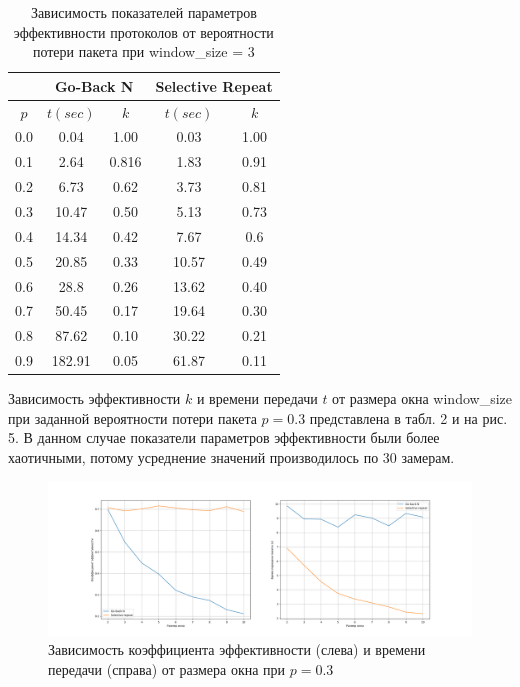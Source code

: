 \begin{table}[H]
	\begin{center}
		\begin{tabular}{|c|c|c|c|c|}
			\hline
			 & \multicolumn{2}{c|}{Go-Back N} & \multicolumn{2}{c|}{Selective Repeat} \\
			\hline
			$p$ & $t (sec)$ & $k$ & $t (sec)$ & $k$ \\
			\hline
			0.0 & 0.04 & 1.00 & 0.03 & 1.00 \\
			\hline
			0.1 & 2.64 & 0.816 & 1.83 & 0.91\\
			\hline
			0.2 & 6.73 & 0.62 & 3.73 & 0.81\\
			\hline
			0.3 & 10.47 & 0.50 & 5.13 & 0.73\\
			\hline
            0.4 & 14.34 & 0.42 & 7.67 & 0.6\\
			\hline
			0.5 & 20.85 & 0.33 & 10.57 & 0.49\\
			\hline
			0.6 & 28.8 & 0.26 & 13.62 & 0.40\\
			\hline
			0.7 & 50.45 & 0.17 & 19.64 & 0.30\\
			\hline
			0.8 & 87.62 & 0.10 & 30.22 & 0.21\\
			\hline
			0.9 & 182.91 & 0.05 & 61.87 & 0.11\\
			\hline
		\end{tabular}
		\caption{ Зависимость показателей параметров эффективности протоколов от вероятности потери пакета при window\_size = 3}
	\end{center}
\end{table}


Зависимость
эффективности $k$ и времени передачи $t$ от размера окна window\_size при
заданной вероятности потери пакета $p = 0.3$ представлена в табл. 2 и на рис. 5. В данном случае показатели параметров эффективности были более хаотичными, потому усреднение значений производилось по 30 замерам. 

\begin{figure}[H]
	\begin{center}
		\includegraphics[scale=0.35]{ws_test.png}
		\caption{Зависимость коэффициента эффективности (слева) и времени передачи (справа) от размера окна при $p = 0.3$}
	\end{center}
\end{figure}

